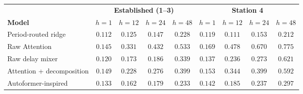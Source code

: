 \begin{tabular}{l cccc cccc}
\toprule
& \multicolumn{4}{c}{\textbf{Established (1--3)}} & \multicolumn{4}{c}{\textbf{Station 4}} \\
\cmidrule(lr){2-5}\cmidrule(lr){6-9}
\textbf{Model} & $h=1$ & $h=12$ & $h=24$ & $h=48$ & $h=1$ & $h=12$ & $h=24$ & $h=48$ \\
\midrule
Period-routed ridge & $0.112$ & $0.125$ & $0.147$ & $0.228$ & $0.119$ & $0.111$ & $0.153$ & $0.212$ \\
Raw Attention & $0.145$ & $0.331$ & $0.432$ & $0.533$ & $0.169$ & $0.478$ & $0.670$ & $0.775$ \\
Raw delay mixer & $0.120$ & $0.173$ & $0.186$ & $0.339$ & $0.137$ & $0.236$ & $0.273$ & $0.621$ \\
Attention + decomposition & $0.149$ & $0.228$ & $0.276$ & $0.399$ & $0.153$ & $0.344$ & $0.399$ & $0.592$ \\
Autoformer-inspired & $0.133$ & $0.162$ & $0.179$ & $0.233$ & $0.142$ & $0.185$ & $0.237$ & $0.297$ \\
\bottomrule
\end{tabular}
